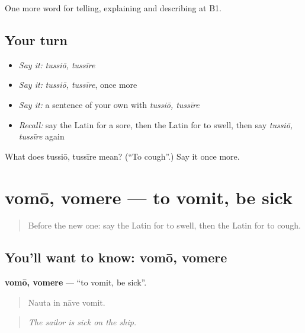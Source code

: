 \begin{grammarlens}[title={What you've built}]
One more word for telling, explaining and describing at B1.
\end{grammarlens}

\subsection*{Your turn}
\begin{itemize}
\raggedright
  \item \emph{Say it:} \emph{tussiō, tussīre}
  \item \emph{Say it:} \emph{tussiō, tussīre}, once more
  \item \emph{Say it:} a sentence of your own with \emph{tussiō, tussīre}
  \item \emph{Recall:} say the Latin for a sore, then the Latin for to swell, then say \emph{tussiō, tussīre} again
\end{itemize}

\begin{tcolorbox}[breakable,colback=teal!4,colframe=teal!35!black,title={Before you move on}]
What does tussiō, tussīre mean? (\textquotedblleft{}To cough\textquotedblright{}.) Say it once more.
\end{tcolorbox}
\section[vomō, vomere]{vomō, vomere — to vomit, be sick}

\label{lesson:LA-C525-vomo}



\begin{quote}
Before the new one: say the Latin for to swell, then the Latin for to cough.
\end{quote}

\subsection*{You'll want to know: vomō, vomere}
\textbf{vomō, vomere} — \textquotedblleft{}to vomit, be sick\textquotedblright{}.

\begin{quote}
Nauta in nāve vomit.
\end{quote}

\begin{quote}
\emph{The sailor is sick on the ship.}
\end{quote}

